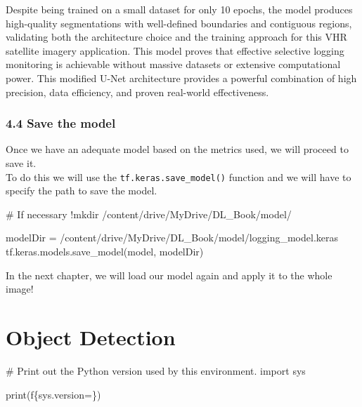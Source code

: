\documentclass[
  letterpaper,
  DIV=11,
  numbers=noendperiod]{scrreprt}
\newenvironment{Shaded}{\begin{snugshade}}{\end{snugshade}}
\newcommand{\BuiltInTok}[1]{\textcolor[rgb]{0.00,0.23,0.31}{#1}}
\newcommand{\CommentTok}[1]{\textcolor[rgb]{0.37,0.37,0.37}{#1}}
\newcommand{\ImportTok}[1]{\textcolor[rgb]{0.00,0.46,0.62}{#1}}
\newcommand{\NormalTok}[1]{\textcolor[rgb]{0.00,0.23,0.31}{#1}}
\newcommand{\OperatorTok}[1]{\textcolor[rgb]{0.37,0.37,0.37}{#1}}
\newcommand{\SpecialCharTok}[1]{\textcolor[rgb]{0.37,0.37,0.37}{#1}}
\newcommand{\SpecialStringTok}[1]{\textcolor[rgb]{0.13,0.47,0.30}{#1}}
\newcommand{\StringTok}[1]{\textcolor[rgb]{0.13,0.47,0.30}{#1}}
\begin{document}
Despite being trained on a small dataset for only 10 epochs, the model
produces high-quality segmentations with well-defined boundaries and
contiguous regions, validating both the architecture choice and the
training approach for this VHR satellite imagery application. This model
proves that effective selective logging monitoring is achievable without
massive datasets or extensive computational power. This modified U-Net
architecture provides a powerful combination of high precision, data
efficiency, and proven real-world effectiveness.

\subsection{4.4 Save the model}\label{save-the-model}

Once we have an adequate model based on the metrics used, we will
proceed to save it.\\
To do this we will use the \texttt{tf.keras.save\_model()} function and
we will have to specify the path to save the model.

\begin{Shaded}
\begin{Highlighting}[]
\CommentTok{\# If necessary}
\OperatorTok{!}\NormalTok{mkdir }\OperatorTok{/}\NormalTok{content}\OperatorTok{/}\NormalTok{drive}\OperatorTok{/}\NormalTok{MyDrive}\OperatorTok{/}\NormalTok{DL\_Book}\OperatorTok{/}\NormalTok{model}\OperatorTok{/}
\end{Highlighting}
\end{Shaded}

\begin{Shaded}
\begin{Highlighting}[]
\NormalTok{modelDir }\OperatorTok{=} \StringTok{\textquotesingle{}/content/drive/MyDrive/DL\_Book/model/logging\_model.keras\textquotesingle{}}
\NormalTok{tf.keras.models.save\_model(model, modelDir)}
\end{Highlighting}
\end{Shaded}

In the next chapter, we will load our model again and apply it to the
whole image!


\chapter{Object Detection}\label{object-detection}

\begin{Shaded}
\begin{Highlighting}[]
\CommentTok{\# Print out the Python version used by this environment.}
\ImportTok{import}\NormalTok{ sys}

\BuiltInTok{print}\NormalTok{(}\SpecialStringTok{f\textquotesingle{}}\SpecialCharTok{\{}\NormalTok{sys}\SpecialCharTok{.}\NormalTok{version}\OperatorTok{=}\SpecialCharTok{\}}\SpecialStringTok{\textquotesingle{}}\NormalTok{)}
\end{Highlighting}
\end{Shaded}
\end{document}

